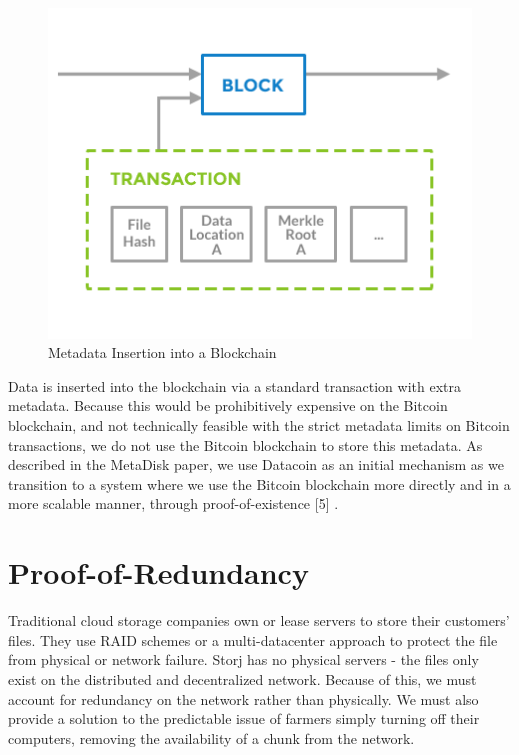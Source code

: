 \documentclass[a4paper,10pt]{article}
\begin{document}
\begin{figure}[h!]
\centering
\includegraphics[width=\linewidth]{3}
\caption{Metadata Insertion into a Blockchain}
\end{figure}

Data is inserted into the blockchain via a standard transaction with extra metadata. Because this would be prohibitively expensive on the Bitcoin blockchain, and not technically feasible with the strict metadata limits on Bitcoin transactions, we do not use the Bitcoin blockchain to store this metadata. As described in the MetaDisk \cite{1} paper, we use Datacoin \cite{6} as an initial mechanism as we transition to a system where we use the Bitcoin blockchain more directly and in a more scalable manner, through proof-of-existence \cite{4} [5] \cite{7}.  

\section{Proof-of-Redundancy}
Traditional cloud storage companies own or lease servers to store their customers’ files. They use RAID schemes or a multi-datacenter approach to protect the file from physical or network failure. Storj has no physical servers - the files only exist on the distributed and decentralized network. Because of this, we must account for redundancy on the network rather than physically. We must also provide a solution to the predictable issue of farmers simply turning off their computers, removing the availability of a chunk from the network. \\
\end{document}
